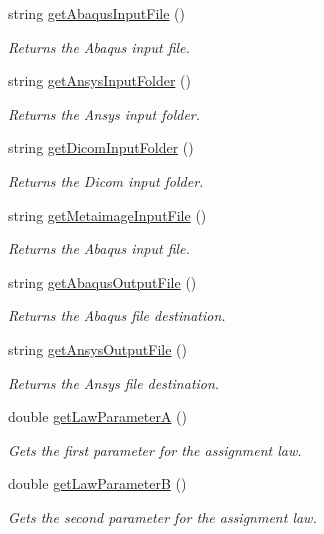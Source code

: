 \begin{DoxyCompactItemize}
$$string \hyperlink{classcommand_1_1_parameter_parser_afe39700e6cbaf3c08042cb2ad0a665f9}{getAbaqusInputFile} ()
\begin{DoxyCompactList}\small\item\em Returns the Abaqus input file. \item\end{DoxyCompactList}\item 
string \hyperlink{classcommand_1_1_parameter_parser_ae49c945fa67ed139c54679c636dc6e82}{getAnsysInputFolder} ()
\begin{DoxyCompactList}\small\item\em Returns the Ansys input folder. \item\end{DoxyCompactList}\item 
string \hyperlink{classcommand_1_1_parameter_parser_a24f467a6aad45d1dbb7b0b80b238c6dd}{getDicomInputFolder} ()
\begin{DoxyCompactList}\small\item\em Returns the Dicom input folder. \item\end{DoxyCompactList}\item 
string \hyperlink{classcommand_1_1_parameter_parser_abaf5fed7dedf9f2c4155cee75041321d}{getMetaimageInputFile} ()
\begin{DoxyCompactList}\small\item\em Returns the Abaqus input file. \item\end{DoxyCompactList}\item 
string \hyperlink{classcommand_1_1_parameter_parser_a6e4c59f60f04b2a25b940a1ab27c8734}{getAbaqusOutputFile} ()
\begin{DoxyCompactList}\small\item\em Returns the Abaqus file destination. \item\end{DoxyCompactList}\item 
string \hyperlink{classcommand_1_1_parameter_parser_adedfc9af8c5993e4b3776231b093faf9}{getAnsysOutputFile} ()
\begin{DoxyCompactList}\small\item\em Returns the Ansys file destination. \item\end{DoxyCompactList}\item 
double \hyperlink{classcommand_1_1_parameter_parser_ad69cf3bdc259377f6c65e2de8ae7fb4f}{getLawParameterA} ()
\begin{DoxyCompactList}\small\item\em Gets the first parameter for the assignment law. \item\end{DoxyCompactList}\item 
double \hyperlink{classcommand_1_1_parameter_parser_aa14baf15782ee89164d535bffa975bf9}{getLawParameterB} ()
\begin{DoxyCompactList}\small\item\em Gets the second parameter for the assignment law. \item\end{DoxyCompactList}\end{DoxyCompactItemize}
